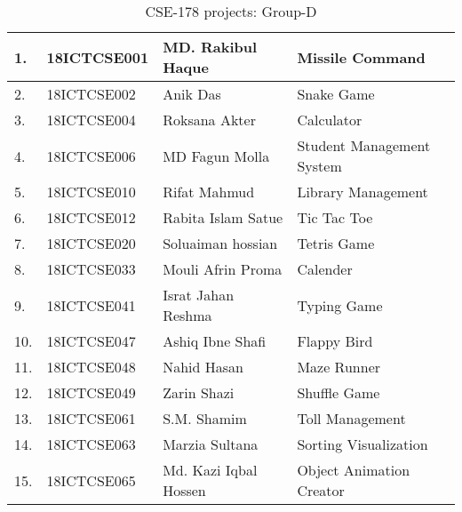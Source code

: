 \documentclass[11 pt]{article}
\begin{document}
	\pagestyle{empty}
	\begin{table}
		\caption{CSE-178 projects: Group-D}
		\centering
		\begin{tabular}{| l | l | l | l |}
			\hline
			1. & 18ICTCSE001 & MD. Rakibul Haque & Missile Command \\
			\hline
			2. & 18ICTCSE002 & Anik Das &  Snake Game \\
			\hline
			3. & 18ICTCSE004 & Roksana Akter &  Calculator \\
			\hline
			4. & 18ICTCSE006  & MD Fagun Molla & Student Management System \\
			\hline
			5. & 18ICTCSE010 & Rifat Mahmud &  Library Management \\
			\hline
			6. & 18ICTCSE012 & Rabita Islam Satue &  Tic Tac Toe \\
			\hline
			7. & 18ICTCSE020 & Soluaiman hossian &  Tetris Game \\
			\hline
			8. & 18ICTCSE033 & Mouli Afrin Proma &  Calender \\
			\hline
			9. & 18ICTCSE041 & Israt Jahan Reshma &  Typing Game \\
			\hline
			10. & 18ICTCSE047 &  Ashiq Ibne Shafi & Flappy Bird \\
			\hline
			11. & 18ICTCSE048 & Nahid Hasan &  Maze Runner \\
			\hline
			12. & 18ICTCSE049 & Zarin Shazi & Shuffle Game \\
			\hline
			13. & 18ICTCSE061 & S.M. Shamim & Toll Management \\
			\hline
			14. & 18ICTCSE063 & Marzia Sultana &  Sorting Visualization \\
			\hline
			15. & 18ICTCSE065 & Md. Kazi Iqbal Hossen &  Object Animation Creator \\
			\hline
		\end{tabular}
	\end{table}
\end{document}
